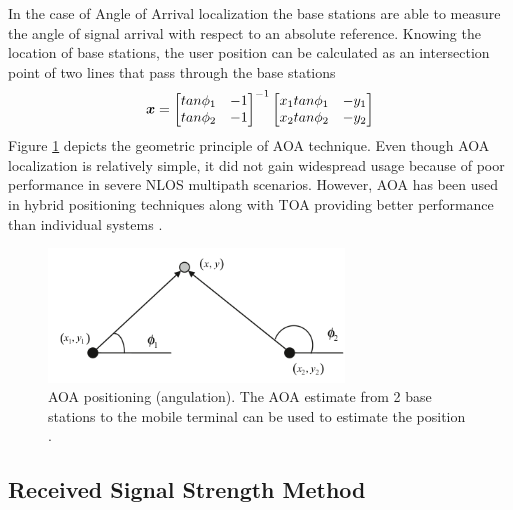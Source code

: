 In the case of Angle of Arrival localization the base stations are able to measure the angle of signal arrival with respect to an absolute reference. 
Knowing the location of base stations, the user position can be calculated as an intersection point of two lines that pass through the base stations \cite{Dempster}
\begin{equation}
\nonumber
\mbox{\boldmath$x$} = \begin{bmatrix}
tan\phi_1 & -1 \\
tan\phi_2 & -1
\end{bmatrix}^{-1} \begin{bmatrix}
x_1 tan\phi_1 & -y_1 \\
x_2 tan\phi_2 & -y_2
\end{bmatrix}
\end{equation}
Figure \ref{fig:aoa} depicts the geometric principle of AOA technique. Even though AOA localization is relatively simple, it did not gain widespread usage because of poor performance in severe NLOS multipath scenarios. However, AOA has been used in hybrid positioning techniques along with TOA providing better performance than individual systems \cite{ChangChang}.  


\begin{figure}[h]
\centering
\includegraphics[width=0.7\textwidth]{figures/angle_of_arrival.png}
\caption{AOA positioning (angulation). The AOA estimate from 2 base stations to the mobile terminal can be used to estimate the position \cite{GeoLoc}.}
\label{fig:aoa}
\end{figure}


\subsection{Received Signal Strength Method}


